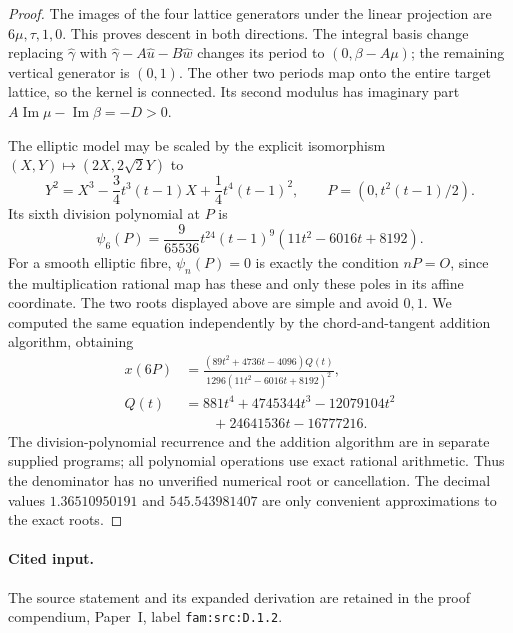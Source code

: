 \begin{proof}
The images of the four lattice generators under the linear projection
are \(6\mu,\tau,1,0\). This proves descent in both directions.
The integral basis change replacing \(\widehat\gamma\) with
\(\widehat\gamma-A\widehat u-B\widehat w\) changes its period to
\((0,\beta-A\mu)\); the remaining vertical generator is \((0,1)\).
The other two periods map onto the entire target lattice, so the kernel
is connected. Its second modulus has imaginary part
\(A\operatorname{Im}\mu-\operatorname{Im}\beta=-D>0\).

The elliptic model may be scaled by the explicit isomorphism
\((X,Y)\mapsto(2X,2\sqrt2Y)\) to
\[
 Y^2=X^3-\frac34t^3(t-1)X+\frac14t^4(t-1)^2,
 \qquad P=(0,t^2(t-1)/2).
\]
Its sixth division polynomial at \(P\) is
\[
 \psi_6(P)=\frac9{65536}t^{24}(t-1)^9
 (11t^2-6016t+8192).
\]
For a smooth elliptic fibre, \(\psi_n(P)=0\) is exactly the condition
\(nP=O\), since the multiplication rational map has these and only these
poles in its affine coordinate. The two roots displayed above are simple
and avoid \(0,1\). We computed the same equation independently by the
chord-and-tangent addition algorithm, obtaining
\[
 \begin{aligned}
 x(6P)&=\frac{(89t^2+4736t-4096)Q(t)}
 {1296(11t^2-6016t+8192)^2},\\
 Q(t)&=881t^4+4745344t^3-12079104t^2\\
 &\hspace{2em}+24641536t-16777216.
 \end{aligned}
\]
The division-polynomial recurrence and the addition algorithm are in
separate supplied programs; all polynomial operations use exact rational
arithmetic. Thus the denominator has no unverified numerical root or
cancellation. The decimal values \(1.36510950191\) and
\(545.543981407\) are only convenient approximations to the exact roots.
\end{proof}


\paragraph{Cited input.} \label{fam:src:D.1.2}\label{fam:st:D.1.2}The source statement and its expanded derivation are retained in the proof compendium, Paper~I, label \nolinkurl{fam:src:D.1.2}.\par



